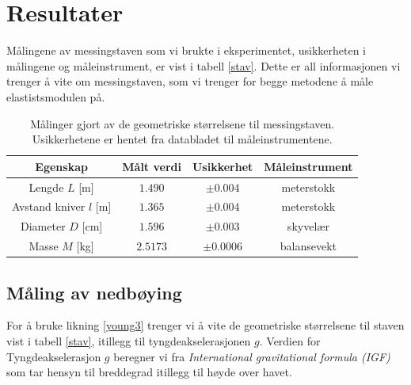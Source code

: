 \documentclass[%
 reprint,
 amsmath,amssymb,
 aps,
 norsk,
 booktabs
]{revtex4-1}
\begin{document}
\section{Resultater}
Målingene av messingstaven som vi brukte i eksperimentet, usikkerheten i målingene og måleinstrument, er vist i tabell \vref{stav}. Dette er all informasjonen vi trenger å vite om messingstaven, som vi trenger for begge metodene å måle elastistsmodulen på.
\begin{table}[h!]
\centering
\caption{Målinger gjort av de geometriske størrelsene til messingstaven. Usikkerhetene er hentet fra databladet til måleinstrumentene.}
\label{stav}
\begin{tabular}{cccc}
    Egenskap & Målt verdi      &    Usikkerhet & Måleinstrument \\
    \hline
    Lengde $L$ [m] & $1.490$    & $\pm 0.004$  & meterstokk  \\
    Avstand kniver $l$ [m] & $1.365$ & $\pm0.004$ & meterstokk \\
    Diameter $D$ [cm] & $1.596$    & $\pm0.003$ & skyvelær    \\
    Masse $M$    [kg]  & $2.5173$   & $\pm0.0006$   & balansevekt \\  \hline
\end{tabular}
\end{table}
\subsection{Måling av nedbøying}
For å bruke likning \eqref{young3} trenger vi å vite de geometriske størrelsene til staven vist i tabell \vref{stav}, itillegg til tyngdeakselerasjonen $g$. Verdien for Tyngdeakselerasjon $g$ beregner vi fra \textit{International gravitational formula (IGF)} som tar hensyn til breddegrad itillegg til høyde over havet. 
\end{document}
